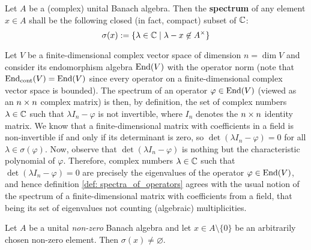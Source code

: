             \begin{definition} \label{def: spectra_of_operators}
                Let $A$ be a (complex) unital Banach algebra. Then the \textbf{spectrum} of any element $x \in A$ shall be the following closed (in fact, compact) subset of $\mathbb{C}$:
                    $$\sigma(x) := \{\lambda \in \bbC \mid \lambda - x \not \in A^{\x}\}$$
            \end{definition}
            \begin{example} \label{example: spectral_elements_are_eigenvalues}
                Let $V$ be a finite-dimensional complex vector space of dimension $n = \dim V$ and consider its endomorphism algebra $\mathrm{End}(V)$ with the operator norm (note that $\mathrm{End}_{\mathrm{cont}}(V) = \mathrm{End}(V)$ since every operator on a finite-dimensional complex vector space is bounded). The spectrum of an operator $\varphi \in \mathrm{End}(V)$ (viewed as an $n \x n$ complex matrix) is then, by definition, the set of complex numbers $\lambda \in \mathbb{C}$ such that $\lambda I_n - \varphi$ is not invertible, where $I_n$ denotes the $n \x n$ identity matrix. We know that a finite-dimensional matrix with coefficients in a field is non-invertible if and only if its determinant is zero, so $\det(\lambda I_n - \varphi) = 0$ for all $\lambda \in \sigma(\varphi)$. Now, observe that $\det(\lambda I_n - \varphi)$ is nothing but the characteristic polynomial of $\varphi$. Therefore, complex numbers $\lambda \in \mathbb{C}$ such that $\det(\lambda I_n - \varphi) = 0$ are precisely the eigenvalues of the operator $\varphi \in \mathrm{End}(V)$, and hence definition \ref{def: spectra_of_operators} agrees with the usual notion of the spectrum of a finite-dimensional matrix with coefficients from a field, that being its set of eigenvalues not counting (algebraic) multiplicities.
            \end{example}
            \begin{proposition} \label{prop: spectra_of_non_zero_operators_are_non_empty}
                Let $A$ be a unital \textit{non-zero} Banach algebra and let $x \in A \setminus \{0\}$ be an arbitrarily chosen non-zero element. Then $\sigma(x) \not = \varnothing$. 
            \end{proposition}
